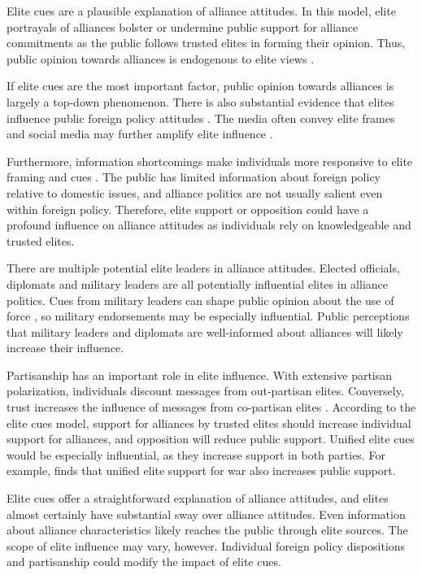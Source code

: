 \documentclass[12pt]{article}
\begin{document}
Elite cues are a plausible explanation of alliance attitudes. 
In this model, elite portrayals of alliances bolster or undermine public support for alliance commitments as the public follows trusted elites in forming their opinion.
Thus, public opinion towards alliances is endogenous to elite views \citep{Druckman2014}.


If elite cues are the most important factor, public opinion towards alliances is largely a top-down phenomenon.
There is also substantial evidence that elites influence public foreign policy attitudes \citep{BaumPotter2008}. 
The media often convey elite frames and social media may further amplify elite influence \citep{BaumPotter2019}.   


Furthermore, information shortcomings make individuals more responsive to elite framing and cues \citep{Druckman2001, Peterson2017}.  
The public has limited information about foreign policy relative to domestic issues, and alliance politics are not usually salient even within foreign policy. 
Therefore, elite support or opposition could have a profound influence on alliance attitudes as individuals rely on knowledgeable and trusted elites. 


There are multiple potential elite leaders in alliance attitudes. 
Elected officials, diplomats and military leaders are all potentially influential elites in alliance politics. 
Cues from military leaders can shape public opinion about the use of force \citep{Golbyetal2018}, so military endorsements may be especially influential. 
Public perceptions that military leaders and diplomats are well-informed about alliances will likely increase their influence. 


Partisanship has an important role in elite influence.
With extensive partisan polarization, individuals discount messages from out-partisan elites. 
Conversely, trust increases the influence of messages from co-partisan elites \citep{Druckmanetal2013}. 
According to the elite cues model, support for alliances by trusted elites should increase individual support for alliances, and opposition will reduce public support.  
Unified elite cues would be especially influential, as they increase support in both parties.
For example, \citet{Berinsky2007} finds that unified elite support for war also increases public support. 


Elite cues offer a straightforward explanation of alliance attitudes, and elites almost certainly have substantial sway over alliance attitudes.
Even information about alliance characteristics likely reaches the public through elite sources. 
The scope of elite influence may vary, however.
Individual foreign policy dispositions and partisanship could modify the impact of elite cues. 
\end{document}
